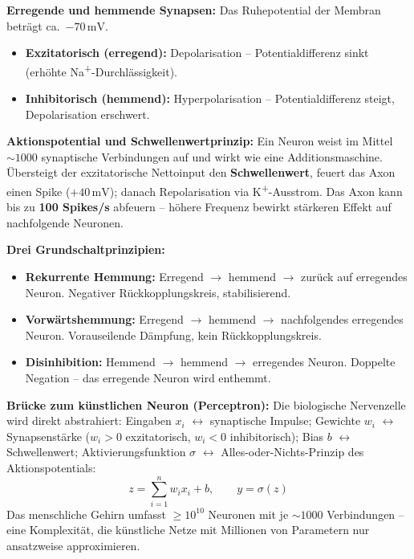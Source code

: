 
\textbf{Erregende und hemmende Synapsen:} Das Ruhepotential der Membran beträgt ca.\ $-70\,\text{mV}$.
\begin{itemize}[leftmargin=1.5em]
    \item \textbf{Exzitatorisch (erregend):} Depolarisation -- Potentialdifferenz sinkt (erhöhte Na\textsuperscript{+}-Durchlässigkeit).
    \item \textbf{Inhibitorisch (hemmend):} Hyperpolarisation -- Potentialdifferenz steigt, Depolarisation erschwert.
\end{itemize}

\textbf{Aktionspotential und Schwellenwertprinzip:} Ein Neuron weist im Mittel $\sim 1000$ synaptische Verbindungen auf und wirkt wie eine Additionsmaschine. Übersteigt der exzitatorische Nettoinput den \textbf{Schwellenwert}, feuert das Axon einen Spike ($+40\,\text{mV}$); danach Repolarisation via K\textsuperscript{+}-Ausstrom. Das Axon kann bis zu \textbf{100 Spikes/s} abfeuern -- höhere Frequenz bewirkt stärkeren Effekt auf nachfolgende Neuronen.

\textbf{Drei Grundschaltprinzipien:}
\begin{itemize}[leftmargin=1.5em]
    \item \textbf{Rekurrente Hemmung:} Erregend $\to$ hemmend $\to$ zurück auf erregendes Neuron. Negativer Rückkopplungskreis, stabilisierend.
    \item \textbf{Vorwärtshemmung:} Erregend $\to$ hemmend $\to$ nachfolgendes erregendes Neuron. Vorauseilende Dämpfung, kein Rückkopplungskreis.
    \item \textbf{Disinhibition:} Hemmend $\to$ hemmend $\to$ erregendes Neuron. Doppelte Negation -- das erregende Neuron wird enthemmt.
\end{itemize}

\textbf{Brücke zum künstlichen Neuron (Perceptron):} Die biologische Nervenzelle wird direkt abstrahiert: Eingaben $x_i$ $\leftrightarrow$ synaptische Impulse; Gewichte $w_i$ $\leftrightarrow$ Synapsenstärke ($w_i>0$ exzitatorisch, $w_i<0$ inhibitorisch); Bias $b$ $\leftrightarrow$ Schwellenwert; Aktivierungsfunktion $\sigma$ $\leftrightarrow$ Alles-oder-Nichts-Prinzip des Aktionspotentials:
\[
z = \sum_{i=1}^{n} w_i x_i + b, \qquad y = \sigma(z)
\]
Das menschliche Gehirn umfasst $\geq 10^{10}$ Neuronen mit je $\sim 1000$ Verbindungen -- eine Komplexität, die künstliche Netze mit Millionen von Parametern nur ansatzweise approximieren.

